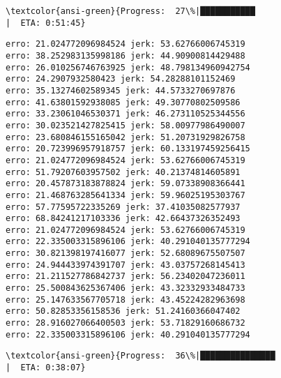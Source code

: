 \documentclass[11pt]{article}
\begin{document}
    \begin{Verbatim}[commandchars=\\\{\}]
\textcolor{ansi-green}{Progress:  27\%|███████████                              |  ETA: 0:51:45}
    \end{Verbatim}

    \begin{Verbatim}[commandchars=\\\{\}]
erro: 21.024772096984524 jerk: 53.62766006745319
erro: 38.252983135998186 jerk: 44.90900814429488
erro: 26.010256746763925 jerk: 48.798134960942754
erro: 24.2907932580423 jerk: 54.28288101152469
erro: 35.13274602589345 jerk: 44.5733270697876
erro: 41.63801592938085 jerk: 49.30770802509586
erro: 33.23061046530371 jerk: 46.273110525344556
erro: 30.023521427825415 jerk: 58.00977986490007
erro: 23.680846155165042 jerk: 51.20731929826758
erro: 20.723996957918757 jerk: 60.133197459256415
erro: 21.024772096984524 jerk: 53.62766006745319
erro: 51.79207603957502 jerk: 40.21374814605891
erro: 20.457873183878824 jerk: 59.07338908366441
erro: 21.468763285641334 jerk: 59.96025195303767
erro: 57.77595722335269 jerk: 37.41035082577937
erro: 68.84241217103336 jerk: 42.66437326352493
erro: 21.024772096984524 jerk: 53.62766006745319
erro: 22.335003315896106 jerk: 40.291040135777294
erro: 30.821398197416077 jerk: 52.68089675507507
erro: 24.944433974391707 jerk: 43.03757268145413
erro: 21.211527786842737 jerk: 56.23402047236011
erro: 25.500843625367406 jerk: 43.32332933484733
erro: 25.147633567705718 jerk: 43.45224282963698
erro: 50.82853356158536 jerk: 51.24160366047402
erro: 28.916027066400503 jerk: 53.71829160686732
erro: 22.335003315896106 jerk: 40.291040135777294

    \end{Verbatim}

    \begin{Verbatim}[commandchars=\\\{\}]
\textcolor{ansi-green}{Progress:  36\%|███████████████                          |  ETA: 0:38:07}
    \end{Verbatim}
\end{document}
